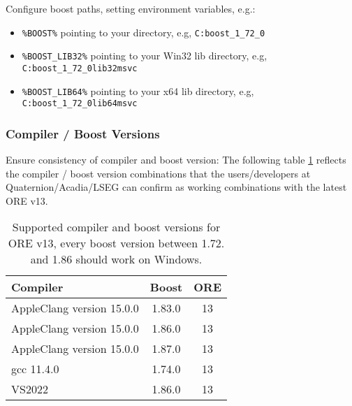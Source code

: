 Configure boost paths, setting environment variables, e.g.:
\begin{itemize}
\item {\tt \%BOOST\%} pointing to your directory, e.g, {\tt C:{\bs}boost\_1\_72\_0} 
\item {\tt \%BOOST\_LIB32\%} pointing to your Win32 lib directory, e.g, {\tt C:{\bs}boost\_1\_72\_0{\bs}lib32\-msvc} 
\item {\tt \%BOOST\_LIB64\%} pointing to your x64 lib directory, e.g, {\tt C:{\bs}boost\_1\_72\_0{\bs}lib64\-msvc} 
\end{itemize}

\subsubsection*{Compiler / Boost Versions}
\label{sec:compiler_boost_versions}

Ensure consistency of compiler and boost version: The following table \ref{tab:compiler_boost_versions} reflects the compiler / boost
version combinations that the users/developers at Quaternion/Acadia/LSEG can confirm as working combinations with the latest ORE v13.

\begin{table}[hbt]
  \begin{tabular}{|l|c|c|}
    \hline
    Compiler & Boost & ORE \\
    \hline
    AppleClang version 15.0.0 & 1.83.0 & 13\\
    AppleClang version 15.0.0 & 1.86.0 & 13\\
    AppleClang version 15.0.0 & 1.87.0 & 13\\
    gcc 11.4.0 & 1.74.0 & 13 \\
    VS2022 & 1.86.0 & 13 \\
    \hline
  \end{tabular}
  \caption{Supported compiler and boost versions for ORE v13, every boost version between 1.72. and 1.86 should work on Windows.}
  \label{tab:compiler_boost_versions}
\end{table}

